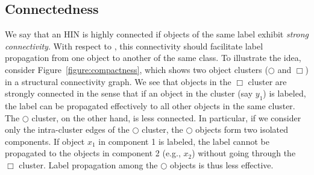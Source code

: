 %
%

\subsection{Connectedness}
We say that an HIN is highly connected if objects of the same label exhibit {\it strong connectivity}.
With respect to \tc, this connectivity should facilitate label propagation from one object to another of the same class.
To illustrate the idea, consider Figure~\ref{figure:compactness}, which shows two object clusters ($\Circle$ and $\Box$) in
a structural connectivity graph.
We see that objects in the $\Box$ cluster are strongly connected in the sense that if
an object in the cluster (say $y_1$) is labeled, the label can be propagated effectively to all other objects in the same cluster.
The $\Circle$ cluster, on the other hand, is less connected. 
In particular, if we consider only the intra-cluster edges of the $\Circle$ cluster, the $\Circle$ objects form two isolated components.
If object $x_1$ in component 1 is labeled, the label cannot be propagated to the objects in component 2 (e.g., $x_2$)
without going through the $\Box$ cluster.
Label propagation among the $\Circle$ objects is thus less effective.


